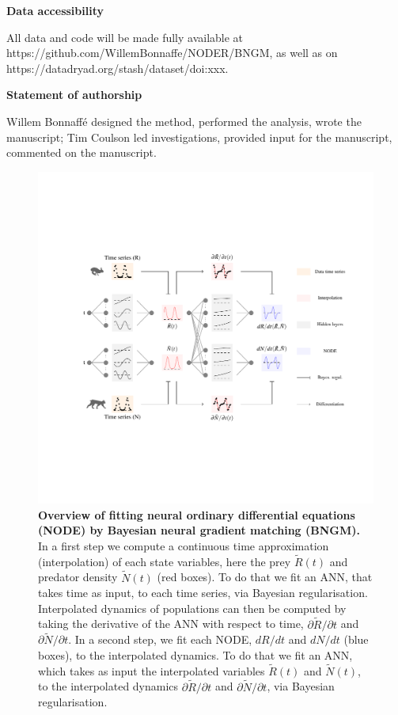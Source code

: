 \documentclass[11pt, oneside]{article}
\begin{document}
\textbf{Data accessibility}

All data and code will be made fully available at https://github.com/WillemBonnaffe/NODER/BNGM, as well as on https://datadryad.org/stash/dataset/doi:xxx.

\textbf{Statement of authorship}

Willem Bonnaff\'e designed the method, performed the analysis, wrote the manuscript; 
Tim Coulson led investigations, provided input for the manuscript, commented on the manuscript.

\printbibliography 

\newpage
{}

\newpage
\begin{figure}[H]
\includegraphics[width=\linewidth,page=1]{figures/main.pdf}
\caption{
    \textbf{Overview of fitting neural ordinary differential equations (NODE) by Bayesian neural gradient matching (BNGM).}
    In a first step we compute a continuous time approximation (interpolation) of each state variables, here the prey $\tilde{R}(t)$ and predator density $\tilde{N}(t)$ (red boxes).
    To do that we fit an ANN, that takes time as input, to each time series, via Bayesian regularisation.
    Interpolated dynamics of populations can then be computed by taking the derivative of the ANN with respect to time, $\partial\tilde{R}/\partial t$ and $\partial\tilde{N}/\partial t$.
    In a second step, we fit each NODE, $dR/dt$ and $dN/dt$ (blue boxes), to the interpolated dynamics.
    To do that we fit an ANN, which takes as input the interpolated variables $\tilde{R}(t)$ and $\tilde{N}(t)$, to the interpolated dynamics $\partial\tilde{R}/\partial t$ and $\partial\tilde{N}/\partial t$, via Bayesian regularisation.
}
\end{figure}
\newpage
\end{document}
